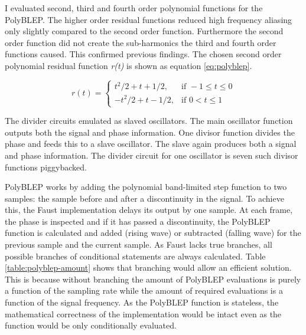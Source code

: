 \documentclass[11pt,a4paper]{article}
\begin{document}
I evaluated second, third and fourth order polynomial functions for the PolyBLEP. The higher order residual functions reduced high frequency aliasing only slightly compared to the second order function. Furthermore the second order function did not create the sub-harmonics the third and fourth order functions caused. This confirmed previous findings\cite{pekonen}. The chosen second order polynomial residual function \emph{r(t)} is shown as equation \ref{eq:polyblep}.

\begin{equation}
\label{eq:polyblep}
r(t) = \begin{cases} 	t^2/2  + t + 1/2, & \mbox{if } -1 \leq t \leq 0\\ 
			-t^2/2 + t - 1/2, & \mbox{if } 0 < t \leq 1 \end{cases}
\end{equation}

The divider circuits emulated as slaved oscillators. The main oscillator function outputs both the signal and phase information. One divisor function divides the phase and feeds this to a slave oscillator. The slave again produces both a signal and phase information. The divider circuit for one oscillator is seven such divisor functions piggybacked.

PolyBLEP works by adding the polynomial band-limited step function to two samples: the sample before and after a discontinuity in the signal. To achieve this, the Faust implementation delays its output by one sample. At each frame, the phase is inspected and if it has passed a discontinuity, the PolyBLEP function is calculated and added (rising wave) or subtracted (falling wave) for the previous sample and the current sample. As Faust lacks true branches, all possible branches of conditional statements are always calculated. Table \ref{table:polyblep-amount} shows that branching would allow an efficient solution. This is because without branching the amount of PolyBLEP evaluations is purely a function of the sampling rate while the amount of required evaluations is a function of the signal frequency. As the PolyBLEP function is stateless, the mathematical correctness of the implementation would be intact even as the function would be only conditionally evaluated.
\end{document}
